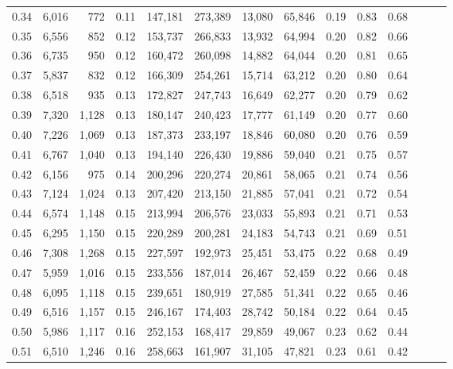 \begin{tabular}{rrrrrrrrrrrrrr}
0.34 &   6,016 &    772 &  0.11 &  147,181 &  273,389 &  13,080 &  65,846 &  0.19 &  0.83 &      0.68 \\
0.35 &   6,556 &    852 &  0.12 &  153,737 &  266,833 &  13,932 &  64,994 &  0.20 &  0.82 &      0.66 \\
0.36 &   6,735 &    950 &  0.12 &  160,472 &  260,098 &  14,882 &  64,044 &  0.20 &  0.81 &      0.65 \\
0.37 &   5,837 &    832 &  0.12 &  166,309 &  254,261 &  15,714 &  63,212 &  0.20 &  0.80 &      0.64 \\
0.38 &   6,518 &    935 &  0.13 &  172,827 &  247,743 &  16,649 &  62,277 &  0.20 &  0.79 &      0.62 \\
0.39 &   7,320 &  1,128 &  0.13 &  180,147 &  240,423 &  17,777 &  61,149 &  0.20 &  0.77 &      0.60 \\
0.40 &   7,226 &  1,069 &  0.13 &  187,373 &  233,197 &  18,846 &  60,080 &  0.20 &  0.76 &      0.59 \\
0.41 &   6,767 &  1,040 &  0.13 &  194,140 &  226,430 &  19,886 &  59,040 &  0.21 &  0.75 &      0.57 \\
0.42 &   6,156 &    975 &  0.14 &  200,296 &  220,274 &  20,861 &  58,065 &  0.21 &  0.74 &      0.56 \\
0.43 &   7,124 &  1,024 &  0.13 &  207,420 &  213,150 &  21,885 &  57,041 &  0.21 &  0.72 &      0.54 \\
0.44 &   6,574 &  1,148 &  0.15 &  213,994 &  206,576 &  23,033 &  55,893 &  0.21 &  0.71 &      0.53 \\
0.45 &   6,295 &  1,150 &  0.15 &  220,289 &  200,281 &  24,183 &  54,743 &  0.21 &  0.69 &      0.51 \\
0.46 &   7,308 &  1,268 &  0.15 &  227,597 &  192,973 &  25,451 &  53,475 &  0.22 &  0.68 &      0.49 \\
0.47 &   5,959 &  1,016 &  0.15 &  233,556 &  187,014 &  26,467 &  52,459 &  0.22 &  0.66 &      0.48 \\
0.48 &   6,095 &  1,118 &  0.15 &  239,651 &  180,919 &  27,585 &  51,341 &  0.22 &  0.65 &      0.46 \\
0.49 &   6,516 &  1,157 &  0.15 &  246,167 &  174,403 &  28,742 &  50,184 &  0.22 &  0.64 &      0.45 \\
0.50 &   5,986 &  1,117 &  0.16 &  252,153 &  168,417 &  29,859 &  49,067 &  0.23 &  0.62 &      0.44 \\
0.51 &   6,510 &  1,246 &  0.16 &  258,663 &  161,907 &  31,105 &  47,821 &  0.23 &  0.61 &      0.42 \\

\end{tabular}
